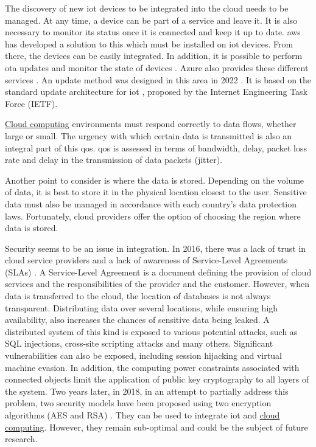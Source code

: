 The discovery of new \acrshort{iot} devices to be integrated into the \gls{cloud} needs to be managed. At any time, a device can be part of a service and leave it. It is also necessary to monitor its status once it is connected and keep it up to date. \gls{aws} has developed a solution to this which must be installed on \acrshort{iot} devices. From there, the devices can be easily integrated. In addition, it is possible to perform \acrfull{ota} updates \cite{ota_aws_iot} and monitor the state of devices \cite{status_aws_iot}. Azure also provides these different services \cite{ota_azure_iot, status_azure_iot}. An update method was designed in this area in 2022 \cite{OTA_Solution_proposed}. It is based on the standard update architecture for \acrshort{iot} \cite{firmware_update_architecture_iot}, proposed by the Internet Engineering Task Force (IETF).

\hyperref[subsec:cloudcomputing]{Cloud computing} environments must respond correctly to data flows, whether large or small. The urgency with which certain data is transmitted is also an integral part of this \acrshort{qos}. \acrshort{qos} is assessed in terms of bandwidth, delay, packet loss rate and delay in the transmission of data packets (jitter). \cite{cloud_of_thing}

Another point to consider is where the data is stored. Depending on the volume of data, it is best to store it in the physical location closest to the user. Sensitive data must also be managed in accordance with each country's data protection laws. Fortunately, \gls{cloud} providers offer the option of choosing the region where data is stored. \cite{cloud_of_thing}

Security seems to be an issue in integration. In 2016, there was a lack of trust in \gls{cloud} service providers and a lack of awareness of Service-Level Agreements (SLAs) \cite{survey_integration_iot_cloud_computing}. A Service-Level Agreement is a document defining the provision of \gls{cloud} services and the responsibilities of the provider and the customer. However, when data is transferred to the \gls{cloud}, the location of databases is not always transparent. Distributing data over several locations, while ensuring high availability, also increases the chances of sensitive data being leaked. A distributed system of this kind is exposed to various potential attacks, such as SQL injections, cross-site scripting attacks and many others. Significant vulnerabilities can also be exposed, including session hijacking and virtual machine evasion. In addition, the computing power constraints associated with connected objects limit the application of public key cryptography to all layers of the system. Two years later, in 2018, in an attempt to partially address this problem, two security models have been proposed using two encryption algorithms (AES and RSA) \cite{secure_integration_iot_cloud_computing}. They can be used to integrate \acrshort{iot} and \hyperref[subsec:cloudcomputing]{cloud computing}. However, they remain sub-optimal and could be the subject of future research.

